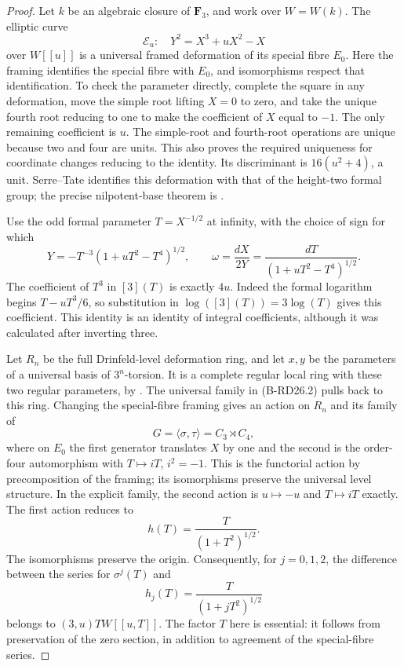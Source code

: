 \begin{proof}
Let $k$ be an algebraic closure of $\mathbf F_3$, and work over
$W=W(k)$. The elliptic curve
\[
       \mathcal E_u:\quad Y^2=X^3+uX^2-X
                                                        \tag{B-RD26.2}
\]
over $W[[u]]$ is a universal framed deformation of its special
fibre $E_0$. Here the framing identifies the special fibre with
$E_0$, and isomorphisms respect that identification. To check the
parameter directly, complete the square in any deformation, move
the simple root lifting $X=0$ to zero, and take the unique fourth
root reducing to one to make the coefficient of $X$ equal to $-1$.
The only remaining coefficient is $u$. The simple-root and
fourth-root operations are unique because two and four are units.
This also proves the required uniqueness for coordinate changes
reducing to the identity. Its discriminant is $16(u^2+4)$, a unit.
Serre--Tate identifies this deformation with that of the height-two
formal group; the precise nilpotent-base theorem is
\cite[Theorem~1.2.1]{Katz1981SerreTate}.

Use the odd formal parameter $T=X^{-1/2}$ at infinity, with the
choice of sign for which
\[
 Y=-T^{-3}(1+uT^2-T^4)^{1/2},\qquad
 \omega=\frac{dX}{2Y}=
                  \frac{dT}{(1+uT^2-T^4)^{1/2}}.
\]
The coefficient of $T^3$ in $[3](T)$ is exactly $4u$.
Indeed the formal logarithm begins $T-uT^3/6$, so substitution in
$\log([3](T))=3\log(T)$ gives this coefficient. This identity is
an identity of integral coefficients, although it was calculated
after inverting three.

Let $R_n$ be the full Drinfeld-level deformation ring, and let
$x,y$ be the parameters of a universal basis of $3^n$-torsion.
It is a complete regular local ring with these two regular
parameters, by \cite[Theorem~2.1.2 and Proposition~2.2.3(i)]
{CarterStrauch2021LubinTate}. The universal family in (B-RD26.2)
pulls back to this ring. Changing the special-fibre framing gives
an action on $R_n$ and its family of
\[
 G=\langle\sigma,\tau\rangle=C_3\rtimes C_4,
\]
where on $E_0$ the first generator translates $X$ by one and the
second is the order-four automorphism with $T\mapsto iT$,
$i^2=-1$. This is the functorial action by precomposition of the
framing; its isomorphisms preserve the universal level structure.
In the explicit family, the second action is $u\mapsto-u$ and
$T\mapsto iT$ exactly. The first action reduces to
\[
              h(T)=\frac{T}{(1+T^2)^{1/2}}.
\]
The isomorphisms preserve the origin. Consequently, for $j=0,1,2$,
the difference between the series for $\sigma^j(T)$ and
\[
                 h_j(T)=\frac{T}{(1+jT^2)^{1/2}}
\]
belongs to $(3,u)T W[[u,T]]$. The factor $T$ here is essential:
it follows from preservation of the zero section, in addition to
agreement of the special-fibre series.


\end{proof}
